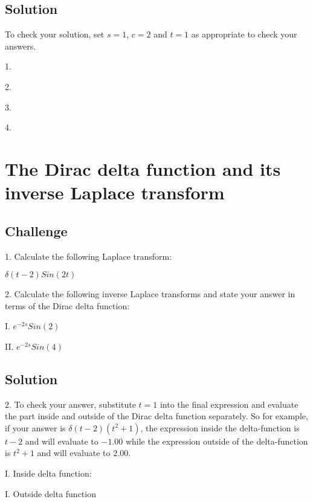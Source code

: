 \subsection*{Solution}
To check your solution, set $s=1$, $c=2$ and $t=1$ as appropriate to check your answers.

1.\\

2.\\

3.\\

4.\\




\newpage
\section{The Dirac delta function and its inverse Laplace transform}

\subsection*{Challenge}
1. Calculate the following Laplace transform:

$\displaystyle \delta(t-2) Sin(2t)$

2. Calculate the following inverse Laplace transforms and state your answer in terms of the Dirac delta function:

I. $\displaystyle e^{-2s} Sin(2)$

II. $\displaystyle e^{-2s} Sin(4)$

\subsection*{Solution}
2. To check your answer, substitute $t=1$ into the final expression and evaluate the part inside and outside of the Dirac delta function separately. So for example, if your answer is $\delta(t-2) (t^2+1)$, the expression inside the delta-function is $t-2$ and will evaluate to $-1.00$ while the expression outside of the delta-function is $t^2+1$ and will evaluate to $2.00$.

I. Inside delta function:\\

I. Outside delta function\\

